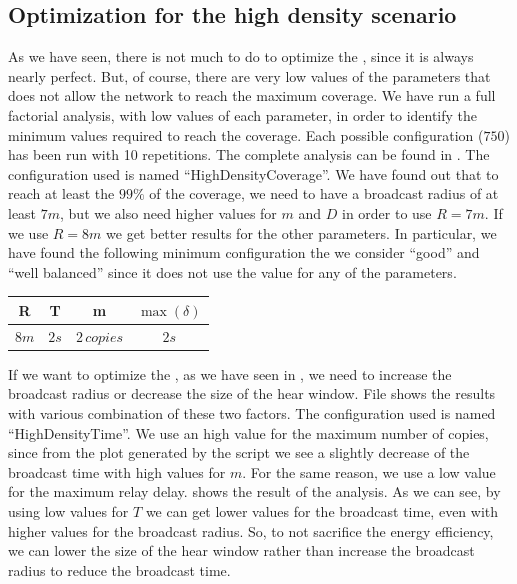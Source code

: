 \subsection{Optimization for the high density
scenario}\label{subsec:hdoptimization}

As we have seen, there is not much to do to optimize the , since it is always nearly perfect. But, of course, there are
very low values of the parameters that does not allow the network to reach the
maximum coverage. We have run a full factorial analysis, with low values of each
parameter, in order to identify the minimum values required to reach the
coverage. Each possible configuration (\(750\)) has been run with 10
repetitions. The complete analysis can be found in . The
configuration used is named ``HighDensityCoverage''. We have found out that to
reach at least the \(99\%\) of the coverage, we need to have a broadcast radius
of at least \(7m\), but we also need higher values for \(m\) and \(D\) in order
to use \(R\!=\!7m\). If we use \(R\!=\!8m\) we get better results for the other
parameters. In particular, we have found the following minimum configuration the
we consider ``good'' and ``well balanced'' since it does not use the value
 for any of the parameters.

\begin{center}
	\begin{tabular}{cccc}
		\toprule
		R & T & m & \(\max(\delta)\) \\
		\midrule
		\(8m\) & \(2s\) & \(2\,\mathit{copies}\) & \(2s\) \\
		\bottomrule
	\end{tabular}
\end{center}

If we want to optimize the , as we have seen in
, we need to increase the broadcast radius or decrease the
size of the hear window. File  shows the results with
various combination of these two factors. The configuration used is named
``HighDensityTime''. We use an high value for the maximum number of copies,
since from the plot generated by the  script we see a slightly
decrease of the broadcast time with high values for \(m\). For the same reason,
we use a low value for the maximum relay delay.  shows the
result of the analysis. As we can see, by using low values for \(T\) we can get
lower values for the broadcast time, even with higher values for the broadcast
radius. So, to not sacrifice the energy efficiency, we can lower the size of the
hear window rather than increase the broadcast radius to reduce the broadcast
time.


